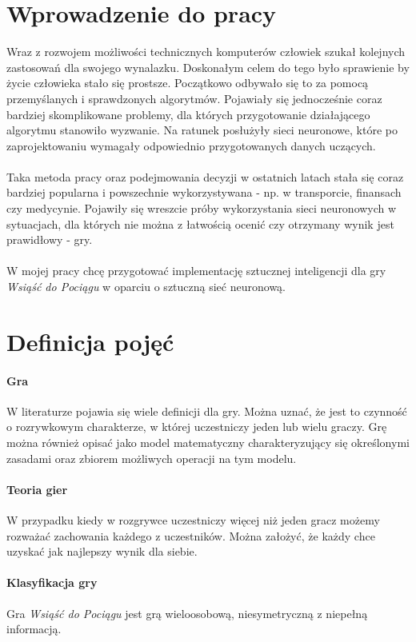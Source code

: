 \documentclass[12pt, oneside]{report}
\begin{document}
\section{Wprowadzenie do pracy}
Wraz z rozwojem możliwości technicznych komputerów człowiek szukał kolejnych zastosowań dla swojego wynalazku. Doskonałym celem do tego było sprawienie by życie człowieka stało się prostsze. Początkowo odbywało się to za pomocą przemyślanych i sprawdzonych algorytmów. Pojawiały się jednocześnie coraz bardziej skomplikowane problemy, dla których przygotowanie działającego algorytmu stanowiło wyzwanie. Na ratunek posłużyły sieci neuronowe, które po zaprojektowaniu wymagały odpowiednio przygotowanych danych uczących. \\ \\
Taka metoda pracy oraz podejmowania decyzji w ostatnich latach stała się coraz bardziej popularna i powszechnie wykorzystywana - np. w transporcie, finansach czy medycynie. Pojawiły się wreszcie próby wykorzystania sieci neuronowych w sytuacjach, dla których nie można z łatwością ocenić czy otrzymany wynik jest prawidłowy - gry. \\ \\ 
W mojej pracy chcę przygotować implementację sztucznej inteligencji dla gry \textit{Wsiąść do Pociągu} w oparciu o sztuczną sieć neuronową. 
\section{Definicja pojęć}
\paragraph{Gra} W literaturze pojawia się wiele definicji dla gry. Można uznać, że jest to czynność o rozrywkowym charakterze, w której uczestniczy jeden lub wielu graczy. Grę można również opisać jako model matematyczny charakteryzujący się określonymi zasadami oraz zbiorem możliwych operacji na tym modelu.
\paragraph{Teoria gier} W przypadku kiedy w rozgrywce uczestniczy więcej niż jeden gracz możemy rozważać zachowania każdego z uczestników. Można założyć, że każdy chce uzyskać jak najlepszy wynik dla siebie.
\paragraph{Klasyfikacja gry}
Gra \textit{Wsiąść do Pociągu} jest grą wieloosobową, niesymetryczną z niepełną informacją. 
\end{document}
